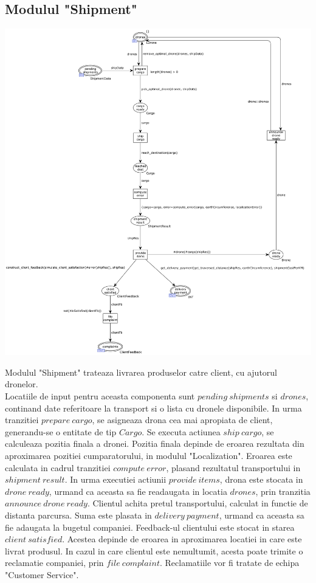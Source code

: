 \begin{spacing}{1.5}
\section{Modulul "Shipment"}

\includegraphics[width=\textwidth]{./Parts/Chapter1/Shipment.png}

Modulul "Shipment" trateaza livrarea produselor catre client, cu ajutorul dronelor.\\
Locatiile de input pentru aceasta componenta sunt $pending\ shipments$ si $drones$, continand date
referitoare la transport si o lista cu dronele disponibile. In urma tranzitiei $prepare\ cargo$, se asigneaza
drona cea mai apropiata de client, generandu-se o entitate de tip $Cargo$. Se executa actiunea $ship\ cargo$,
se calculeaza pozitia finala a dronei. Pozitia finala depinde de eroarea rezultata din aproximarea pozitiei
cumparatorului, in modulul "Localization". Eroarea este calculata in cadrul tranzitiei $compute\ error$,
plasand rezultatul transportului in $shipment\ result$. In urma executiei actiunii $provide\ items$, drona
este stocata in $drone\ ready$, urmand ca aceasta sa fie readaugata in locatia $drones$, prin tranzitia
$announce\ drone\ ready$. Clientul achita pretul transportului, calculat in functie de distanta parcursa.
Suma este plasata in $delivery\ payment$, urmand ca aceasta sa fie adaugata la bugetul companiei.
Feedback-ul clientului este stocat in starea $client\ satisfied$. Acestea depinde de eroarea in aproximarea
locatiei in care este livrat produsul. In cazul in care clientul este nemultumit, acesta poate trimite
o reclamatie companiei, prin $file\ complaint$. Reclamatiile vor fi tratate de echipa "Customer Service".


\end{spacing}

